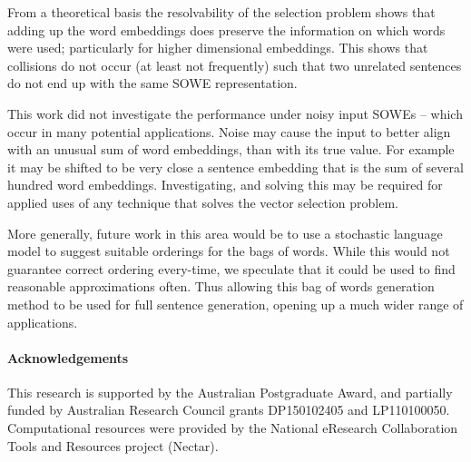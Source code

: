 {From a theoretical basis the resolvability of the selection problem shows that adding up the word embeddings does preserve the information on which words were used; particularly for higher dimensional embeddings. This shows  that collisions do not occur (at least not frequently) such that two unrelated sentences do not end up with the same SOWE representation. 

This work did not investigate the performance under noisy input SOWEs -- which occur in many potential applications. Noise may cause the input to better align with an unusual sum of word embeddings, than with its true value. For example it may be shifted to be very close a sentence embedding that is the sum of several hundred word embeddings. Investigating, and solving this may be required for applied uses of any technique that solves the vector selection problem.

More generally, future work in this area would be to use a stochastic language model to suggest suitable orderings for the bags of words. While this would not guarantee correct ordering every-time, we speculate that it could be used to find reasonable approximations often. Thus allowing this bag of words generation method to be used for full sentence generation, opening up a much wider range of applications.

\paragraph{Acknowledgements}
This research is supported by the Australian Postgraduate
Award, and partially funded by Australian Research Council grants
DP150102405 and LP110100050. Computational resources were provided by the National eResearch Collaboration Tools and Resources project (Nectar).



}
%



